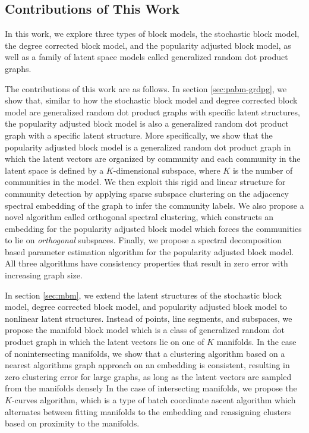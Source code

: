 \documentclass[
  12pt,
]{article}
\theoremstyle{definition}
\theoremstyle{definition}
\theoremstyle{definition}
\theoremstyle{definition}
\theoremstyle{remark}
\begin{document}
\hypertarget{contributions-of-this-work}{%
\subsection{Contributions of This Work}\label{contributions-of-this-work}}

In this work, we explore three types of block models, the stochastic block model, the degree corrected block model, and the popularity adjusted block model, as well as a family of latent space models called generalized random dot product graphs.

The contributions of this work are as follows.
In section \ref{sec:pabm-grdpg}, we show that, similar to how the stochastic block model and degree corrected block model are generalized random dot product graphs with specific latent structures, the popularity adjusted block model is also a generalized random dot product graph with a specific latent structure.
More specifically, we show that the popularity adjusted block model is a generalized random dot product graph in which the latent vectors are organized by community and each community in the latent space is defined by a \(K\)-dimensional subspace, where \(K\) is the number of communities in the model.
We then exploit this rigid and linear structure for community detection by applying sparse subspace clustering on the adjacency spectral embedding of the graph to infer the community labels.
We also propose a novel algorithm called orthogonal spectral clustering, which constructs an embedding for the popularity adjusted block model which forces the communities to lie on \emph{orthogonal} subspaces.
Finally, we propose a spectral decomposition based parameter estimation algorithm for the popularity adjusted block model.
All three algorithms have consistency properties that result in zero error with increasing graph size.

In section \ref{sec:mbm}, we extend the latent structures of the stochastic block model, degree corrected block model, and popularity adjusted block model to nonlinear latent structures.
Instead of points, line segments, and subspaces, we propose the manifold block model which is a class of generalized random dot product graph in which the latent vectors lie on one of \(K\) manifolds.
In the case of nonintersecting manifolds, we show that a clustering algorithm based on a nearest algorithms graph approach on an embedding is consistent, resulting in zero clustering error for large graphs, as long as the latent vectors are sampled from the manifolds densely
In the case of intersecting manifolds, we propose the \(K\)-curves algorithm, which is a type of batch coordinate ascent algorithm which alternates between fitting manifolds to the embedding and reassigning clusters based on proximity to the manifolds.
\end{document}
